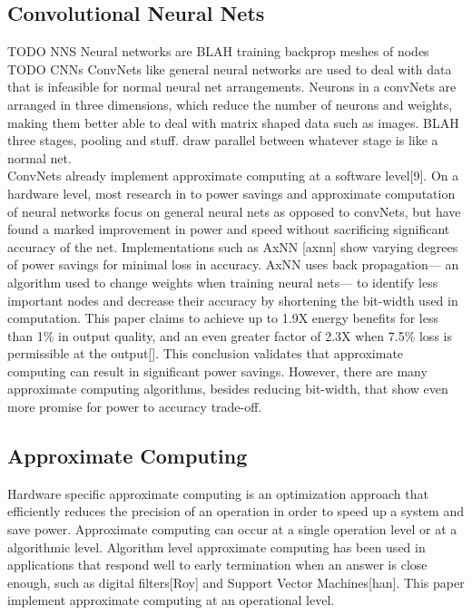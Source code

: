 \documentclass[journal]{IEEEtran}
\begin{document}
\subsection{Convolutional Neural Nets}
TODO NNS
	\indent Neural networks are BLAH training backprop meshes of nodes\\
	
TODO CNNs
	\indent ConvNets like general neural networks are used to deal with data that is infeasible for normal neural net arrangements. Neurons in a convNets are arranged in three dimensions, which reduce the number of neurons and weights, making them better able to deal with matrix shaped data such as images. BLAH three stages, pooling and stuff. draw parallel between whatever stage is like a normal net.  \\
	
	\indent ConvNets already implement approximate computing at a software level[9]. On a hardware level, most research in to power savings and approximate computation of neural networks focus on general neural nets as opposed to convNets, but have found a marked improvement in power and speed without sacrificing significant accuracy of the net. Implementations such as AxNN [axnn] show varying degrees of power savings for minimal loss in accuracy. AxNN uses back propagation--- an algorithm used to change weights when training neural nets--- to identify less important nodes and decrease their accuracy by shortening the bit-width used in computation. This paper claims to achieve up to 1.9X energy benefits for less than 1\% in output quality, and an even greater factor of 2.3X when 7.5\% loss is permissible at the output[]. This conclusion validates that approximate computing can result in significant power savings. However, there are many approximate computing algorithms, besides reducing bit-width, that show even more promise for power to accuracy trade-off.

\subsection{Approximate Computing}

	\indent Hardware specific approximate computing is an optimization approach that efficiently reduces the precision of an operation in order to speed up a system and save power. Approximate computing can occur at a single operation level or at a algorithmic level. Algorithm level approximate computing has been used in applications that respond well to early termination when an answer is close enough, such as digital filters[Roy] and Support Vector Machines[han]. This paper implement approximate computing at an operational level.\\
	
\end{document}
